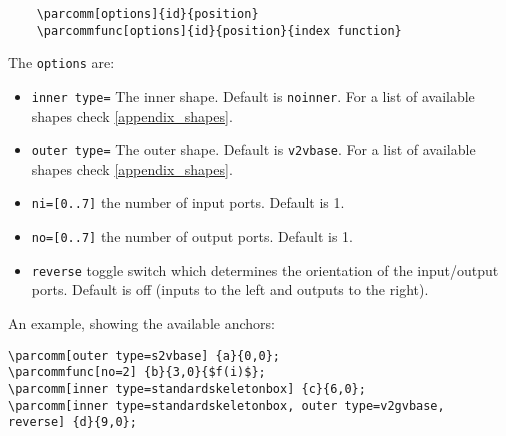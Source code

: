 \documentclass[10pt]{article}
\begin{document}
\begin{verbatim}
	\parcomm[options]{id}{position}
	\parcommfunc[options]{id}{position}{index function}
\end{verbatim}

The \texttt{options} are:
\begin{itemize}
\item \texttt{inner type=} The inner shape. Default is \texttt{noinner}. For a list of available shapes check \autoref{appendix_shapes}.
\item \texttt{outer type=} The outer shape. Default is \texttt{v2vbase}. For a list of available shapes check \autoref{appendix_shapes}.
\item \texttt{ni=[0..7]} the number of input ports. Default is 1.
\item \texttt{no=[0..7]} the number of output ports. Default is 1.
\item\texttt{reverse} toggle switch which determines the orientation of the input/output ports. Default is off (inputs to the left and outputs to the right).
\end{itemize}

An example, showing the available anchors:
\begin{verbatim}
\parcomm[outer type=s2vbase] {a}{0,0};
\parcommfunc[no=2] {b}{3,0}{$f(i)$};
\parcomm[inner type=standardskeletonbox] {c}{6,0};
\parcomm[inner type=standardskeletonbox, outer type=v2gvbase, 
reverse] {d}{9,0};
\end{verbatim}

\begin{figure}[htb!]\centering
{}
\end{figure}
\end{document}
